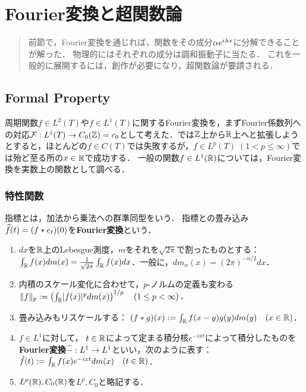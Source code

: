 \documentclass[uplatex,dvipdfmx]{jsreport}
\begin{document}
\chapter{Fourier変換と超関数論}

\begin{quotation}
    前節で，Fourier変換を通じれば，関数をその成分$\alpha e^{i\lambda x}$に分解できることが解った．
    物理的にはそれぞれの成分は調和振動子に当たる．
    これを一般的に展開するには，創作が必要になり，超関数論が要請される．
\end{quotation}

\section{Formal Property}

\begin{tcolorbox}[colframe=ForestGreen, colback=ForestGreen!10!white,breakable,colbacktitle=ForestGreen!40!white,coltitle=black,fonttitle=\bfseries\sffamily,
title=]
    周期関数$f\in L^2(T)$や$f\in L^1(T)$に関するFourier変換を，まずFourier係数列への対応$\mathcal{F}:L^1(T)\to C_0(\mathbb{Z})=c_0$として考えた．では$\mathbb{Z}$上から$\mathbb{R}$上へと拡張しようとすると，ほとんどの$f\in C(T)$では失敗するが，$f\in L^p(T)\;(1<p\le\infty)$では殆ど至る所の$x\in\mathbb{R}$で成功する．
    一般の関数$f\in L^1(\mathbb{R})$については，Fourier変換を実数上の関数として調べる．
\end{tcolorbox}

\subsection{特性関数}

\begin{tcolorbox}[colframe=ForestGreen, colback=ForestGreen!10!white,breakable,colbacktitle=ForestGreen!40!white,coltitle=black,fonttitle=\bfseries\sffamily,
title=]
    指標とは，加法から乗法への群準同型をいう．
    指標との畳み込み$\widehat{f}(t)=(f*e_t)(0)$を\textbf{Fourier変換}という．
\end{tcolorbox}

\begin{notation}\mbox{}
    \begin{enumerate}
        \item $dx$を$\mathbb{R}$上のLebesgue測度，$m$をそれを$\sqrt{2\pi}$で割ったものとする：
        $\int_{\mathbb{R}} f(x)dm(x)=\frac{1}{\sqrt{2\pi}}\int_{\mathbb{R}} f(x)dx$．一般に，$dm_n(x)=(2\pi)^{-n/2}dx$．
        \item 内積のスケール変化に合わせて，$p$-ノルムの定義も変わる
        $\|f\|_p:=\left(\int_{\mathbb{R}}\lvert f(x)\rvert^pdm(x)\right)^{1/p}\quad(1\le p<\infty)$．
        \item 畳み込みもリスケールする：
        $(f*g)(x):=\int_{\mathbb{R}} f(x-y)g(y)dm(y)\quad(x\in\mathbb{R})$．
        \item $f\in L^1$に対して，
        $t\in\mathbb{R}$によって定まる積分核$e^{-ixt}$によって積分したものを\textbf{Fourier変換}$\widehat{-}:L^1\to L^1$といい，次のように表す：
        $\hat{f}(t):=\int_{\mathbb{R}} f(x)e^{-ixt}dm(x)\quad(t\in\mathbb{R})$．
        \item $L^p(\mathbb{R}),C_0(\mathbb{R})$を$L^p,C_0$と略記する．
    \end{enumerate}
\end{notation}
\end{document}
